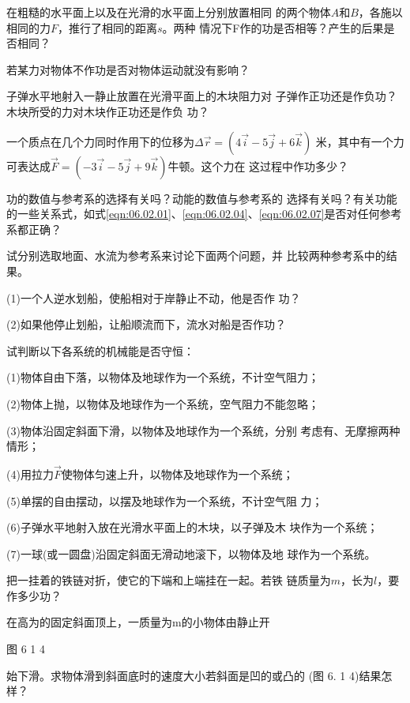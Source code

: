 \begin{questions}

\question 在粗糙的水平面上以及在光滑的水平面上分别放置相同
的两个物体$ A $和$ B $，各施以相同的力$ F $，推行了相同的距离$ s $。两种
情况下F作的功是否相等？产生的后果是否相同？

\question 若某力对物体不作功是否对物体运动就没有影响？

\question 子弹水平地射入一静止放置在光滑平面上的木块阻力对
子弹作正功还是作负功？木块所受的力对木块作正功还是作负
功？

\question 一个质点在几个力同时作用下的位移为$ \Delta \vec{r} = ( 4 \vec{i} - 5 \vec{j} + 6 \vec{k} ) $
米，其中有一个力可表达成$ \vec{F} = ( - 3 \vec{i} - 5 \vec{j} + 9 \vec{k} ) $牛顿。这个力在
这过程中作功多少？

\question 功的数值与参考系的选择有关吗？动能的数值与参考系的
选择有关吗？有关功能的一些关系式，如式\eqref{eqn:06.02.01}、\eqref{eqn:06.02.04}、\eqref{eqn:06.02.07}是否对任何参考系都正确？

\question 试分别选取地面、水流为参考系来讨论下面两个问题，并
比较两种参考系中的结果。

(1)一个人逆水划船，使船相对于岸静止不动，他是否作
功？

(2)如果他停止划船，让船顺流而下，流水对船是否作功？

\question 试判断以下各系统的机械能是否守恒：

(1)物体自由下落，以物体及地球作为一个系统，不计空气阻力；

(2)物体上抛，以物体及地球作为一个系统，空气阻力不能忽略；

(3)物体沿固定斜面下滑，以物体及地球作为一个系统，分别
考虑有、无摩擦两种情形；

(4)用拉力$ \vec{F} $使物体匀速上升，以物体及地球作为一个系统；

(5)单摆的自由摆动，以摆及地球作为一个系统，不计空气阻
力；

(6)子弹水平地射入放在光滑水平面上的木块，以子弹及木
块作为一个系统；

(7)一球(或一圆盘)沿固定斜面无滑动地滚下，以物体及地
球作为一个系统。

\question 把一挂着的铁链对折，使它的下端和上端挂在一起。若铁
链质量为$ m $，长为$ l $，要作多少功？

\question 在高为的固定斜面顶上，一质量为m的小物体由静止开

图 6 1 4

始下滑。求物体滑到斜面底时的速度大小若斜面是凹的或凸的
(图 6. 1 4)结果怎样？


\end{questions}
